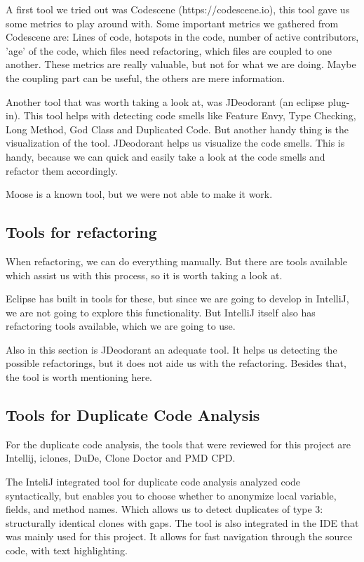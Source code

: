 \documentclass[]{article}
\begin{document}
A first tool we tried out was Codescene (https://codescene.io), this tool gave us some metrics to play around with. Some important metrics we gathered from Codescene are: Lines of code, hotspots in the code, number of active contributors, 'age' of the code, which files need refactoring, which files are coupled to one another. These metrics are really valuable, but not for what we are doing. Maybe the coupling part can be useful, the others are mere information. 

Another tool that was worth taking a look at, was JDeodorant (an eclipse plug-in). This tool helps with detecting code smells like Feature Envy, Type Checking, Long Method, God Class and Duplicated Code. But another handy thing is the visualization of the tool. JDeodorant helps us visualize the code smells. This is handy, because we can quick and easily take a look at the code smells and refactor them accordingly. 

Moose is a known tool, but we were not able to make it work. 

\subsection{Tools for refactoring}
When refactoring, we can do everything manually. But there are tools available which assist us with this process, so it is worth taking a look at. 

Eclipse has built in tools for these, but since we are going to develop in IntelliJ, we are not going to explore this functionality. But IntelliJ itself also has refactoring tools available, which we are going to use.

Also in this section is JDeodorant an adequate tool. It helps us detecting the possible refactorings, but it does not aide us with the refactoring. Besides that, the tool is worth mentioning here. 

\subsection{Tools for Duplicate Code Analysis}
For the duplicate code analysis, the tools that were reviewed for this project are Intellij, iclones, DuDe, Clone Doctor and PMD CPD. 

The InteliJ integrated tool for duplicate code analysis analyzed code syntactically, but enables you to choose whether to anonymize local variable, fields, and method names. Which allows us to detect duplicates of type 3: structurally identical clones with gaps. The tool is also integrated in the IDE that was mainly used for this project. It allows for fast navigation through the source code, with text highlighting. 
\end{document}
